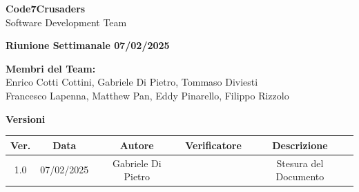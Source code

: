 \documentclass{article}
\begin{document}
\begin{titlepage}
    {\Huge \textbf{Code7Crusaders}}\\
    \vspace{0.5cm}
    {\Large Software Development Team}\\
    \vspace{2cm}
        
        {\large \textbf{Riunione Settimanale 07/02/2025}}\\
    \vspace{5cm}                           %
    
    
    \textbf{Membri del Team:}\\
    Enrico Cotti Cottini, Gabriele Di Pietro, Tommaso Diviesti \\
    Francesco Lapenna, Matthew Pan, Eddy Pinarello, Filippo Rizzolo \\
    \vspace{0.5cm}
    
    \vspace{1cm}
\end{titlepage}



\newpage
\begin{table}[h!]
\centering
\textbf{Versioni} \\ %
\vspace{2mm} %
\begin{tabular}{|c|c|c|c|c|}
    \hline
    \textbf{Ver.} & \textbf{Data} & \textbf{Autore} & \textbf{Verificatore} & \textbf{Descrizione} \\
    \hline
    1.0 & 07/02/2025 & Gabriele Di Pietro &  & Stesura del Documento \\ 
    \hline                                  %
\end{tabular}
\end{table}



\newpage
\end{document}

